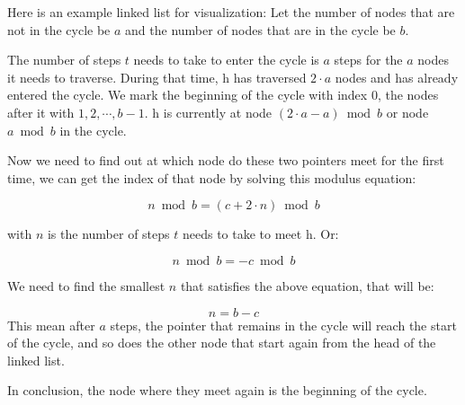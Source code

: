\documentclass[12pt, letterpaper]{article}
\newcommand{\tortoise}{\textit{t}}
\newcommand{\hare}{\textit{h}}
\begin{document}
Here is an example linked list for visualization:
Let the number of nodes that are not in the cycle be \(a\) and the number of nodes that are in the cycle be \(b\). 

The number of steps \( \tortoise \) needs to take to enter the cycle is \( a \) steps for the \( a \) nodes it needs to traverse. During that time, \( \hare \) has traversed \( 2 \cdot a \) nodes and has already entered the cycle. We mark the beginning of the cycle with index 0, the nodes after it with \( 1, 2, \cdots, b - 1 \). \( \hare \) is currently at node \( (2 \cdot a - a) \bmod b \) or node \( a \bmod b \) in the cycle.


Now we need to find out at which node do these two pointers meet for the first time, we can get the index of that node by solving this modulus equation:

\begin{equation}
n \bmod b = (c + 2 \cdot n) \bmod b
\end{equation}

with \(n\) is the number of steps \(\tortoise\) needs to take to meet \(\hare\). Or: 

\begin{equation}
n \bmod b = -c \bmod b
\end{equation}

We need to find the smallest \(n\) that satisfies the above equation, that will be:

\begin{equation}
n  = b-c
\end{equation}
This mean after \(a\) steps, the pointer that remains in the cycle will reach the start of the cycle, and so does the other node that start again from the head of the linked list.

In conclusion, the node where they meet again is the beginning of the cycle.
\end{document}

